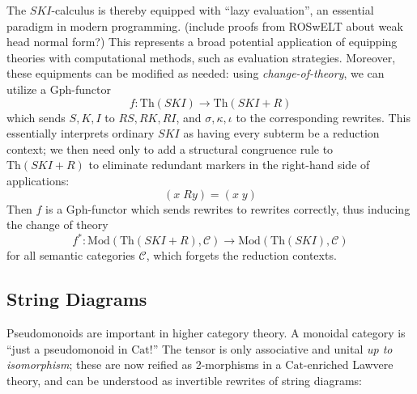 \documentclass[a4paper,UKenglish]{article}
\theoremstyle{definition}
\newcommand{\Th}{\mathrm{Th}}
\newcommand{\Gph}{\mathrm{Gph}}
\newcommand{\Cat}{\mathrm{Cat}}
\newcommand{\Mod}{\mathrm{Mod}}
\newcommand{\C}{\mathscr{C}}
\begin{document}
The $SKI$-calculus is thereby equipped with ``lazy evaluation'', an essential paradigm in modern programming. (include proofs from ROSwELT about weak head normal form?) This represents a broad potential application of equipping theories with computational methods, such as evaluation strategies. Moreover, these equipments can be modified as needed: using \textit{change-of-theory}, we can utilize a $\Gph$-functor $$f: \Th(SKI) \to \Th(SKI+R)$$ which sends $S,K,I$ to $RS,RK,RI$, and $\sigma, \kappa, \iota$ to the corresponding rewrites. This essentially interprets ordinary $SKI$ as having every subterm be a reduction context; we then need only to add a structural congruence rule to $\Th(SKI+R)$ to eliminate redundant markers in the right-hand side of applications: $$(x\; Ry) = (x\; y)$$ Then $f$ is a $\Gph$-functor which sends rewrites to rewrites correctly, thus inducing the change of theory $$f^*: \Mod(\Th(SKI+R),\C) \to \Mod(\Th(SKI),\C)$$ for all semantic categories $\C$, which forgets the reduction contexts.

\subsection{String Diagrams}

Pseudomonoids \cite{pseudo} are important in higher category theory. A monoidal category is ``just a pseudomonoid in $\Cat$!'' The tensor is only associative and unital \textit{up to isomorphism}; these are now reified as 2-morphisms in a $\Cat$-enriched Lawvere theory, and can be understood as invertible rewrites of string diagrams:
\end{document}
